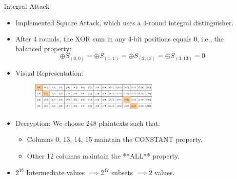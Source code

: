 \begin{frame}{Integral Attack}
\begin{block}{}
    \begin{itemize}
        \item Implemented Square Attack, which uses a 4-round integral distinguisher.
        \item After 4 rounds, the XOR sum in any 4-bit positions equals 0, i.e., the balanced property:
        \[
        \oplus S_{(0,0)} = \oplus S_{(1,1)} = \oplus S_{(2,13)} = \oplus S_{(3,13)} = 0
        \]
        \item Visual Representation:
        \begin{figure}[h!]
            \centering
            \includegraphics[width=0.6\textwidth]{diff1.drawio.png} %
            \label{fig:integral_attack}
        \end{figure}
        \item Decryption: We choose 248 plaintexts such that:
        \begin{itemize}
            \item Columns 0, 13, 14, 15 maintain the CONSTANT property.
            \item Other 12 columns maintain the **ALL** property.
        \end{itemize}
        \item $2^{48}$ Intermediate values $\implies 2^{47}$ subsets $\implies 2$ values.
    \end{itemize}
        
\end{block}
\end{frame}

